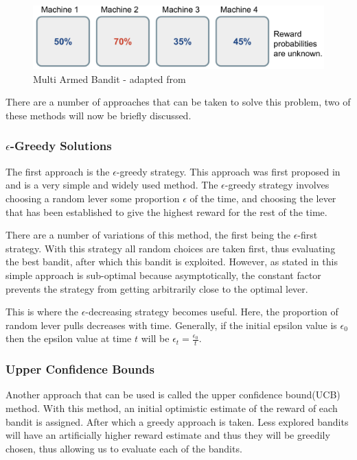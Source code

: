 \begin{figure}[ht]
    \includegraphics[scale=.25]{images/bandit.png}
    \caption{Multi Armed Bandit - adapted from\citep{weng2018multiarm}}
\end{figure}

There are a number of approaches that can be taken to solve this problem, two of these
methods will now be briefly discussed.

\subsubsection{$\epsilon$-Greedy Solutions}\label{subsec:eGreedy}
The first approach is the $\epsilon$-greedy strategy.
This approach was first proposed in\citep{watkins1989learning} and is a very simple and widely used method.
The $\epsilon$-greedy strategy involves choosing a random lever some proportion $\epsilon$ of the time, and
choosing the lever that has been established to give the highest reward for the rest of the time.

There are a number of variations of this method, the first being the $\epsilon$-first strategy.
With this strategy all random choices are taken first, thus evaluating the best bandit,
after which this bandit is exploited.
However, as stated in\citep{vermorel2005multi} this simple approach is sub-optimal because asymptotically,
the constant factor prevents the strategy from getting arbitrarily close to
the optimal lever.

This is where the $\epsilon$-decreasing strategy becomes useful.
Here, the proportion of random lever pulls decreases with time.
Generally, if the initial epsilon value is $\epsilon_0$ then the epsilon value at time $t$ will be
$\epsilon_t = \frac{\epsilon_0}{t}$.

\subsubsection{Upper Confidence Bounds}
Another approach that can be used is called the upper confidence bound(UCB) method.
With this method, an initial optimistic estimate of the reward of each bandit is assigned.
After which a greedy approach is taken.
Less explored bandits will have an artificially higher reward estimate and thus they will be greedily chosen,
thus allowing us to evaluate each of the bandits.

